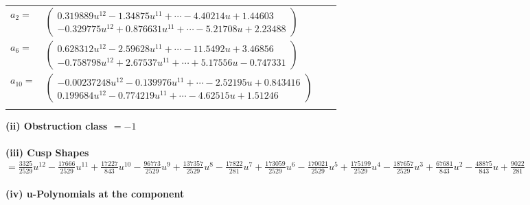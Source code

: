 \documentclass[1p]{elsarticle_modified}
\theoremstyle{definition}
\begin{document}
\begin{tabular}{m{7pt} m{180pt} m{7pt} m{180pt} }
\flushright $a_{2}=$&$\begin{pmatrix}0.319889 u^{12}-1.34875 u^{11}+\cdots-4.40214 u+1.44603\\-0.329775 u^{12}+0.876631 u^{11}+\cdots-5.21708 u+2.23488\end{pmatrix}$ \\
\flushright $a_{6}=$&$\begin{pmatrix}0.628312 u^{12}-2.59628 u^{11}+\cdots-11.5492 u+3.46856\\-0.758798 u^{12}+2.67537 u^{11}+\cdots+5.17556 u-0.747331\end{pmatrix}$ \\
\flushright $a_{10}=$&$\begin{pmatrix}-0.00237248 u^{12}-0.139976 u^{11}+\cdots-2.52195 u+0.843416\\0.199684 u^{12}-0.774219 u^{11}+\cdots-4.62515 u+1.51246\end{pmatrix}$\\&\end{tabular}
\flushleft \textbf{(ii) Obstruction class $= -1$}\\~\\
\flushleft \textbf{(iii) Cusp Shapes $= \frac{3325}{2529} u^{12}-\frac{17666}{2529} u^{11}+\frac{17227}{843} u^{10}-\frac{96773}{2529} u^9+\frac{137357}{2529} u^8-\frac{17822}{281} u^7+\frac{173059}{2529} u^6-\frac{170021}{2529} u^5+\frac{175199}{2529} u^4-\frac{187657}{2529} u^3+\frac{67681}{843} u^2-\frac{48875}{843} u+\frac{9022}{281}$}\\~\\
\newpage\renewcommand{\arraystretch}{1}
\flushleft \textbf{(iv) u-Polynomials at the component}\newline \\
\end{document}
